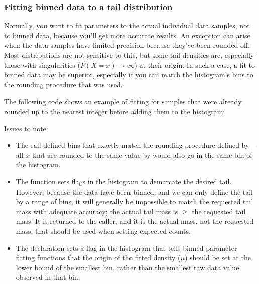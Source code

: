 

\subsubsection{Fitting binned data to a tail distribution}

Normally, you want to fit parameters to the actual individual data
samples, not to binned data, because you'll get more accurate results.
An exception can arise when the data samples have limited precision
because they've been rounded off. Most distributions are not sensitive
to this, but some tail densities are, especially those with
singularities ($P(X=x) \rightarrow \infty$) at their origin. In such a
case, a fit to binned data may be superior, especially if you can
match the histogram's bins to the rounding procedure that was used.

The following code shows an example of fitting for samples that were
already rounded up to the nearest integer before adding them to the
histogram:



Issues to note:

\begin{itemize}
\item The  call
      defined bins that exactly match the rounding procedure
      defined by  -- all $x$ that are rounded
      to the same value by  would also go in
      the same bin of the histogram.

\item The  function sets flags
      in the histogram to demarcate the desired tail.  However,
      because the data have been binned, and we can only define the
      tail by a range of bins, it will generally be impossible to
      match the requested tail mass with adequate accuracy; the actual
      tail mass is $\geq$ the requested tail mass. It is returned
      to the caller, and it is the actual mass, not the requested mass,
      that should be used when setting expected counts.

\item The  declaration
      sets a flag in the histogram that tells binned parameter
      fitting functions that the origin of the fitted
      density ($\mu$) should be set at the lower bound of the smallest bin,
      rather than the smallest raw data value observed in that 
      bin. 
\end{itemize}


